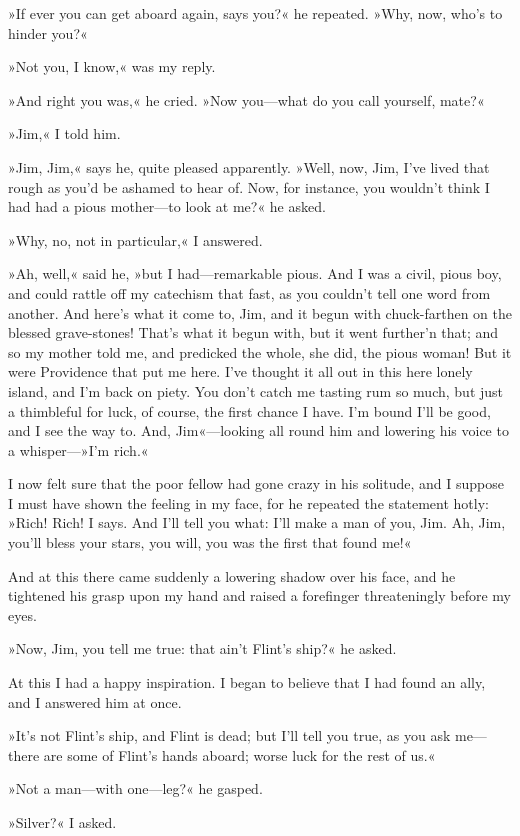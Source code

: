 »If ever you can get aboard again, says you?« he repeated. »Why, now, who's to hinder you?«

»Not you, I know,« was my reply.

»And right you was,« he cried. »Now you—what do you call yourself, mate?«

»Jim,« I told him.

»Jim, Jim,« says he, quite pleased apparently. »Well, now, Jim, I've lived that rough as you'd be ashamed to hear of. Now, for instance, you wouldn't think I had had a pious mother—to look at me?« he asked.

»Why, no, not in particular,« I answered.

»Ah, well,« said he, »but I had—remarkable pious. And I was a civil, pious boy, and could rattle off my catechism that fast, as you couldn't tell one word from another. And here's what it come to, Jim, and it begun with chuck-farthen on the blessed grave-stones! That's what it begun with, but it went further'n that; and so my mother told me, and predicked the whole, she did, the pious woman! But it were Providence that put me here. I've thought it all out in this here lonely island, and I'm back on piety. You don't catch me tasting rum so much, but just a thimbleful for luck, of course, the first chance I have. I'm bound I'll be good, and I see the way to. And, Jim«—looking all round him and lowering his voice to a whisper—»I'm rich.«

I now felt sure that the poor fellow had gone crazy in his solitude, and I suppose I must have shown the feeling in my face, for he repeated the statement hotly: »Rich! Rich! I says. And I'll tell you what: I'll make a man of you, Jim. Ah, Jim, you'll bless your stars, you will, you was the first that found me!«

And at this there came suddenly a lowering shadow over his face, and he tightened his grasp upon my hand and raised a forefinger threateningly before my eyes.

»Now, Jim, you tell me true: that ain't Flint's ship?« he asked.

At this I had a happy inspiration. I began to believe that I had found an ally, and I answered him at once.

»It's not Flint's ship, and Flint is dead; but I'll tell you true, as you ask me—there are some of Flint's hands aboard; worse luck for the rest of us.«

»Not a man—with one—leg?« he gasped.

»Silver?« I asked.

